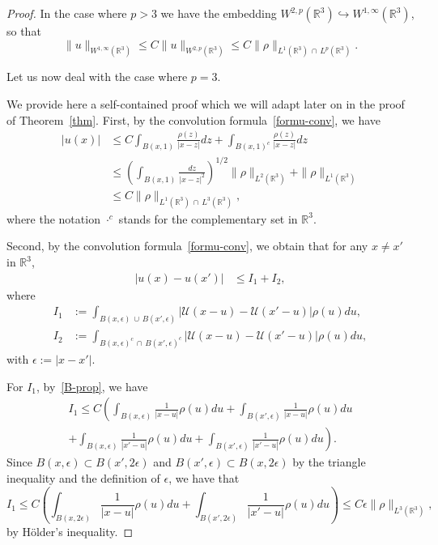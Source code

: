 \documentclass[10pt]{amsart}
\theoremstyle{definition}\newtheorem{defi}[theo]{Definition}\newtheorem{rema}[theo]{Remark}\newtheorem{exam}[theo]{Example}\newtheorem{exem}[theo]{Example}\newtheorem{nota}[theo]{Notation}
\newcommand{\R}{\mathbb{R}}
\newcommand{\clU}{\mathcal{U}}
\renewcommand{\leq}{\leqslant}
\newcommand{\eps}{\epsilon}
\begin{document}
\begin{proof}
In the case where $p>3$ we have the embedding $W^{2,p} (\R^3) \hookrightarrow W^{1,\infty} (\R^3)$, so that
\begin{equation}\label{cotestokes}
\|u\|_{W^{1,\infty} \left(\R^3\right)}\leq C\|u\|_{W^{2,p} \left(\R^3\right)} \leq C \| \rho\|_{L^1 \left(\R^3\right)\,\cap\,L^p \left(\R^3\right)}.
\end{equation}

Let us now deal with the case where $p=3$.

We provide here a self-contained proof which we will adapt later on in the proof of Theorem~\ref{thm}. First, by the convolution formula~\eqref{formu-conv}, we have
\begin{align*}
|u(x)| &\leq C \int_{B(x,1)} \frac{\rho(z)}{|x-z|} dz + \int_{B(x,1)^c}\frac{\rho(z)}{|x-z|} dz
\\ &\leq \left(\int_{B(x,1)}\frac{dz}{|x-z|^2} \right)^{1/2} \|\rho\|_{L^2\left(\R^3\right)}+\|\rho\|_{L^1\left(\R^3\right)}
\\ &\leq C \|\rho\|_{L^1\left(\R^3\right)\,\cap\, L^3\left(\R^3\right)},
\end{align*}
where the notation $\cdot^c$ stands for the complementary set in $\R^3$.

Second, by the convolution formula~\eqref{formu-conv}, we obtain that for any $x\neq x'$ in $\R^3$,
\begin{align*}
|u(x)-u(x') |&\leq I_1 +I_2,
\end{align*}
where
\begin{align*}
I_1 &:= \int_{B(x,\epsilon)\,\cup\,B(x',\epsilon) } \left|\clU(x-u)-\clU(x'-u)\right|\rho(u)du, \\
I_2 &:= \int_{B(x,\epsilon)^c\,\cap\,B(x',\epsilon)^c} \left|\clU(x-u)-\clU(x'-u)\right|\rho(u)du,
\end{align*}
with $\epsilon :=|x-x'|$.

For $I_1$, by~\eqref{B-prop}, we have
\begin{multline*}
I_1 \leq C \left(\int_{B(x,\epsilon)} \frac{1}{|x-u|}\rho(u)du + \int_{B(x',\epsilon)} \frac{1}{|x-u|}\rho(u)du\right.
\\
\left. + \int_{B(x,\epsilon)} \frac{1}{|x'-u|}\rho(u)du + \int_{B(x',\epsilon)} \frac{1}{|x'-u|}\rho(u)du \right).
\end{multline*}
Since $B(x,\eps) \subset B(x',2\eps) $ and $ B(x',\eps) \subset B(x,2\eps)$ by the triangle inequality and the definition of $\epsilon$, we have that
\[
I_1 \leq C \left(\int_{B(x,2\epsilon) } \frac{1}{|x-u|}\rho(u)du + \int_{B(x',2\epsilon)} \frac{1}{|x'-u|}\rho(u)du \right) \leq C \epsilon \|\rho\|_{L^3 \left(\R^3\right)},
\]
by H\"older's inequality.


\end{proof}
\end{document}
